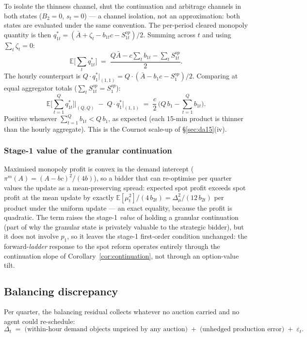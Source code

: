 \documentclass[11pt,a4paper]{article}
\theoremstyle{definition}
\theoremstyle{remark}
\theoremstyle{plain}
\begin{document}
To isolate the thinness channel, shut the continuation and arbitrage channels in both states ($B_2 = 0$, $s_t = 0$) --- a channel isolation, not an approximation: both states are evaluated under the same convention. The per-period cleared monopoly quantity is then $q_{1t}^* = (\bar A + \zeta_t - b_{1t} c - S^{op}_{1t})/2$. Summing across $t$ and using $\sum_t \zeta_t = 0$:
\[
\mathbb{E}\!\bigg[\sum_t q_{1t}^*\bigg] \;=\; \frac{Q \bar A - c \sum_t b_{1t} - \sum_t S^{op}_{1t}}{2}.
\]
The hourly counterpart is $Q\cdot q_1^*|_{(1,1)} = Q\cdot(\bar A - b_1 c - S^{op}_1)/2$. Comparing at equal aggregator totals ($\sum_t S^{op}_{1t} = S^{op}_1$):
\begin{equation}
\mathbb{E}\!\bigg[\sum_{t=1}^{Q} q_{1t}^*\bigg]\bigg|_{(Q,Q)} \;-\; Q\cdot q_1^*\big|_{(1,1)} \;=\; \frac{c}{2}\,\bigg(Q\, b_1 - \sum_{t=1}^{Q} b_{1t}\bigg).
\label{eq:scale-up}
\end{equation}
Positive whenever $\sum_{t=1}^{Q} b_{1t} < Q\,b_1$, as expected (each 15-min product is thinner than the hourly aggregate). This is the Cournot scale-up of \S\ref{sec:da15}(iv).

\subsubsection{Stage-1 value of the granular continuation}

Maximised monopoly profit is convex in the demand intercept ($\pi^m(A) = (A - bc)^2/(4b)$), so a bidder that can re-optimise per quarter values the update as a mean-preserving spread: expected spot profit exceeds spot profit at the mean update by exactly $\mathbb{E}[\mu_t^2]/(4\, b_{2t}) = \Delta_\mu^2/(12\, b_{2t})$ per product under the uniform update --- an exact equality, because the profit is quadratic. The term raises the stage-1 \emph{value} of holding a granular continuation (part of why the granular state is privately valuable to the strategic bidder), but it does not involve $p_1$, so it leaves the stage-1 first-order condition unchanged: the forward-\emph{ladder} response to the spot reform operates entirely through the continuation slope of Corollary~\ref{cor:continuation}, not through an option-value tilt.

\subsection{Balancing discrepancy}\label{sec:balancing-app}

Per quarter, the balancing residual collects whatever no auction carried and no agent could re-schedule:
\begin{equation}
\Delta_t \;=\; \bigl(\text{within-hour demand objects unpriced by any auction}\bigr) \;+\; \bigl(\text{unhedged production error}\bigr) \;+\; \varepsilon_t.
\label{eq:balancing-disc}
\end{equation}
\end{document}
